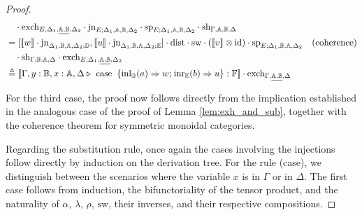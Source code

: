 \documentclass[10pt,a4paper]{amsart}
\theoremstyle{definition}
\theoremstyle{definition}
\theoremstyle{definition}
\theoremstyle{definition}
\theoremstyle{definition}
\theoremstyle{definition}
\begin{document}
\begin{proof}
\begin{align*}
  & \hspace{10pt}  \cdot  \text{exch}_{E, \Delta_{1},\underline{\typeA,\typeB},  \Delta_{2}} \cdot  \text{jn}_{E ;\Delta_{1},\typeA,\typeB,  \Delta_{2}}   \cdot\text{sp}_{E; \Delta_{1},\typeA,\typeB,  \Delta_{2}} \cdot \text{sh}_{\Gamma,\typeA, \typeB,\Delta} \\
  & = [[\![ w ]\!] \cdot \text{jn}_{\Delta_{1} ,\typeB,\typeA,  \Delta_{2};\typeD},  [\![u ]\!] \cdot \text{jn}_{\Delta_{1} ,\typeB,\typeA,  \Delta_{2};\typeE}] \cdot \text{dist} \cdot \text{sw} \cdot ([\![  v  ]\!] \otimes \text{id}) \cdot \text{sp}_{E; \Delta_{1}, \typeB,\typeA,  \Delta_{2}} & {\text{(coherence)}} \\
  & \hspace{10pt} \cdot  \text{sh}_{\Gamma; \typeB,\typeA, \Delta} \cdot  \text{exch}_{E, \Delta_{1},\underline{\typeA,\typeB},  \Delta_{2}} \\
  & \triangleq [\![\Gamma,y:\typeB, x:\typeA, \Delta \vljud \text{ case }  \hspace{2pt}  \{\text{inl}_{\typeD} (a) \Rightarrow w ; \hspace{1pt} \text{inr}_{\typeE} (b) \Rightarrow u\}: \typeF]\!] \cdot \text{exch}_{\Gamma,\underline{\typeA,  \typeB}, \Delta}
\end{align*}



For the third case, the proof now follows directly from the implication established in the analogous case of the proof of Lemma \ref{lem:exh_and_sub}, together with the coherence theorem for symmetric monoidal categories.

Regarding the substitution rule, once again the cases involving the injections follow directly by induction on the derivation tree. For the rule (case), we distinguish between the scenarios where the variable $x$ is in $\Gamma$ or in $\Delta$. The first case follows from induction, the bifunctoriality of the tensor product, and the naturality of $\alpha$, $\lambda$, $\rho$, $\text{sw}$, their inverses, and their respective compositions.


\end{proof}
\end{document}
